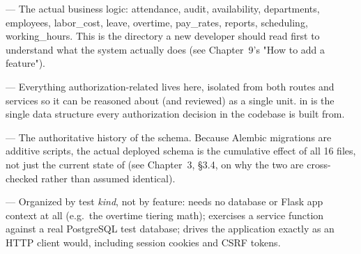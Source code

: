 \textbf{} --- The actual business logic: attendance,
audit, availability, departments, employees, labor\_cost, leave,
overtime, pay\_rates, reports, scheduling, working\_hours. This is the
directory a new developer should read first to understand what the
system actually does (see Chapter~9's "How to add a feature").

\textbf{} --- Everything authorization-related lives
here, isolated from both routes and services so it can be reasoned
about (and reviewed) as a single unit.  in
 is the single data structure every authorization
decision in the codebase is built from.

\textbf{} --- The authoritative history of
the schema. Because Alembic migrations are additive scripts, the actual
deployed schema is the cumulative effect of all 16 files, not just the
current state of  (see Chapter~3, \S3.4, on why the
two are cross-checked rather than assumed identical).

\textbf{} --- Organized by test \emph{kind}, not by
feature:  needs no database or Flask app context at all
(e.g.\ the overtime tiering math);  exercises a
service function against a real PostgreSQL test database; 
drives the application exactly as an HTTP client would, including
session cookies and CSRF tokens.
